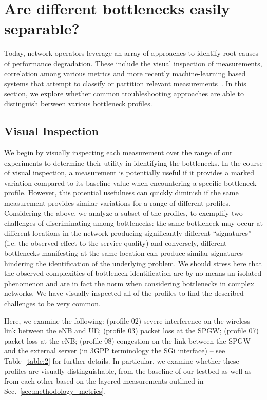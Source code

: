 \documentclass[journal,comsoc]{IEEEtran}
\begin{document}
\section{Are different bottlenecks easily separable?}
\label{sec:analysis}

% 
Today, network operators leverage an array of approaches to identify root causes of performance degradation.
These include the visual inspection of measurements, correlation among various metrics and more recently machine-learning based systems that attempt to classify or partition relevant measurements~\cite{iyer2017automating, PadmanabhaIyerTradeoff}.
In this section, we explore whether common troubleshooting approaches are able to distinguish between various bottleneck profiles.

% 
\subsection{Visual Inspection}
\label{sec:analysis_initial}

% 

We begin by visually inspecting each measurement over the range of our experiments to determine their utility in identifying the bottlenecks.
In the course of visual inspection, a measurement is potentially useful if it provides a marked variation compared to its baseline value when encountering a specific bottleneck profile.
However, this potential usefulness can quickly diminish if the same measurement provides similar variations for a range of different profiles.
Considering the above, we analyze a subset of the profiles, to exemplify two challenges of discriminating among bottlenecks: the same bottleneck may occur at different locations in the network producing significantly different ``signatures'' (i.e. the observed effect to the service quality) and conversely, different bottlenecks manifesting at the same location can produce similar signatures hindering the identification of the underlying problem.
We should stress here that the observed complexities of bottleneck identification are by no means an isolated phenomenon and are in fact the norm when considering bottlenecks in complex networks.
We have visually inspected all of the profiles to find the described challenges to be very common. 

Here, we examine the following: 
(profile 02) severe interference on the wireless link between the eNB and UE; (profile 03) packet loss at the SPGW; (profile 07) packet loss at the eNB; (profile 08) congestion on the link between the SPGW and the external server (in 3GPP terminology the SGi interface) -- see Table~\ref{table:2} for further details.
In particular, we examine whether these profiles are visually distinguishable, from the baseline of our testbed as well as from each other based on the layered measurements outlined in Sec.~\ref{sec:methodology_metrics}.
\end{document}
